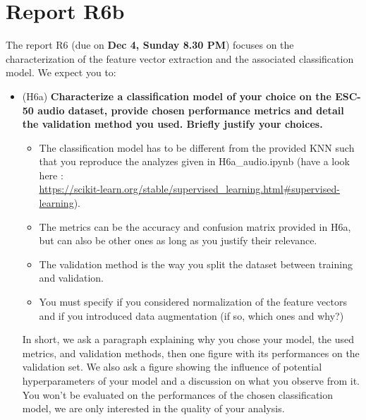 \section{Report R6b}
%
The report R6 (due on \textbf{Dec 4, Sunday 8.30 PM}) focuses on the characterization of the feature vector extraction and the associated classification model. We expect you to:
%
\begin{itemize}
    \item (H6a) \textbf{Characterize a classification model of your choice on the ESC-50 audio dataset, provide chosen performance metrics and detail the validation method you used. Briefly justify your choices.}
    \begin{itemize}
        \item The classification model has to be different from the provided KNN such that you reproduce the analyzes given in H6a\_audio.ipynb (have a look here :\\ \url{https://scikit-learn.org/stable/supervised\_learning.html#supervised-learning}).
        \item The metrics can be the accuracy and confusion matrix provided in H6a, but can also be other ones as long as you justify their relevance.
        \item The validation method is the way you split the dataset between training and validation.
        \item You must specify if you considered normalization of the feature vectors and if you introduced data augmentation (if so, which ones and why?)
    \end{itemize}
    In short, we ask a paragraph explaining why you chose your model, the used metrics, and validation methods, then one figure with its performances on the validation set. We also ask a figure showing the influence of potential hyperparameters of your model and a discussion on what you observe from it. You won't be evaluated on the performances of the chosen classification model, we are only interested in the quality of your analysis.

\end{itemize}
